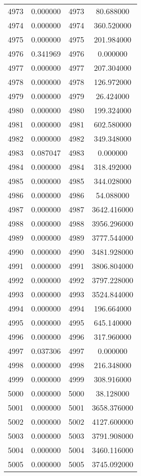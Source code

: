 \documentclass[12pt]{article}
\begin{document}
\begin{longtable}{@{}cccc@{}}
4973 & 0.000000 & 4973 & 80.688000 \\
4974 & 0.000000 & 4974 & 360.520000 \\
4975 & 0.000000 & 4975 & 201.984000 \\
4976 & 0.341969 & 4976 & 0.000000 \\
4977 & 0.000000 & 4977 & 207.304000 \\
4978 & 0.000000 & 4978 & 126.972000 \\
4979 & 0.000000 & 4979 & 26.424000 \\
4980 & 0.000000 & 4980 & 199.324000 \\
4981 & 0.000000 & 4981 & 602.580000 \\
4982 & 0.000000 & 4982 & 349.348000 \\
4983 & 0.087047 & 4983 & 0.000000 \\
4984 & 0.000000 & 4984 & 318.492000 \\
4985 & 0.000000 & 4985 & 344.028000 \\
4986 & 0.000000 & 4986 & 54.088000 \\
4987 & 0.000000 & 4987 & 3642.416000 \\
4988 & 0.000000 & 4988 & 3956.296000 \\
4989 & 0.000000 & 4989 & 3777.544000 \\
4990 & 0.000000 & 4990 & 3481.928000 \\
4991 & 0.000000 & 4991 & 3806.804000 \\
4992 & 0.000000 & 4992 & 3797.228000 \\
4993 & 0.000000 & 4993 & 3524.844000 \\
4994 & 0.000000 & 4994 & 196.664000 \\
4995 & 0.000000 & 4995 & 645.140000 \\
4996 & 0.000000 & 4996 & 317.960000 \\
4997 & 0.037306 & 4997 & 0.000000 \\
4998 & 0.000000 & 4998 & 216.348000 \\
4999 & 0.000000 & 4999 & 308.916000 \\
5000 & 0.000000 & 5000 & 38.128000 \\
5001 & 0.000000 & 5001 & 3658.376000 \\
5002 & 0.000000 & 5002 & 4127.600000 \\
5003 & 0.000000 & 5003 & 3791.908000 \\
5004 & 0.000000 & 5004 & 3460.116000 \\
5005 & 0.000000 & 5005 & 3745.092000 \\

\end{longtable}
\end{document}
